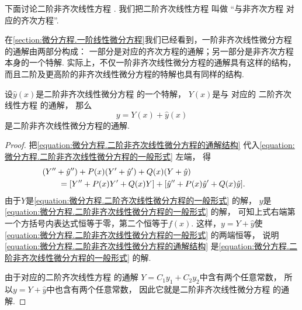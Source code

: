 下面讨论二阶非齐次线性方程 .
我们把二阶齐次线性方程  叫做%
“与非齐次方程  对应的齐次方程”.


在\cref{section:微分方程.一阶线性微分方程}我们已经看到，一阶非齐次线性微分方程的通解由两部分构成：
一部分是对应的齐次方程的通解；另一部分是非齐次方程本身的一个特解.
实际上，不仅一阶非齐次线性微分方程的通解具有这样的结构，
而且二阶及更高阶的非齐次线性微分方程的特解也具有同样的结构.
\begin{theorem}\label{theorem:微分方程.二阶非齐次线性微分方程的通解结构}
设\(\hat{y}(x)\)是二阶非齐次线性微分方程  的一个特解，
\(Y(x)\)是与  对应的
二阶齐次线性方程  的通解，
那么\begin{equation}\label{equation:微分方程.二阶非齐次线性微分方程的通解结构}
	y=Y(x)+\hat{y}(x)
\end{equation}是二阶非齐次线性微分方程的通解.
\begin{proof}
把\cref{equation:微分方程.二阶非齐次线性微分方程的通解结构}
代入\cref{equation:微分方程.二阶非齐次线性微分方程的一般形式} 左端，
得\begin{align*}
	&\hspace{-20pt}
	(Y'' + \hat{y}'')
	+ P(x) (Y' + \hat{y}')
	+ Q(x) (Y + \hat{y}) \\
	&= [Y'' + P(x) Y' + Q(x) Y]
	+ [\hat{y}'' + P(x) \hat{y}' + Q(x) \hat{y}].
\end{align*}
由于\(Y\)是\cref{equation:微分方程.二阶齐次线性微分方程的一般形式} 的解，
\(\hat{y}\)是\cref{equation:微分方程.二阶非齐次线性微分方程的一般形式} 的解，
可知上式右端第一个方括号内表达式恒等于零，第二个恒等于\(f(x)\).
这样，\(y = Y + \hat{y}\)使
\cref{equation:微分方程.二阶非齐次线性微分方程的一般形式} 的两端恒等，
说明\cref{equation:微分方程.二阶非齐次线性微分方程的通解结构}
是\cref{equation:微分方程.二阶非齐次线性微分方程的一般形式} 的解.

由于对应的二阶齐次线性方程  的通解
\(Y = C_1 y_1 + C_2 y_2\)中含有两个任意常数，
所以\(y = Y + \hat{y}\)中也含有两个任意常数，
因此它就是二阶非齐次线性微分方程  的通解.
\end{proof}
\end{theorem}

